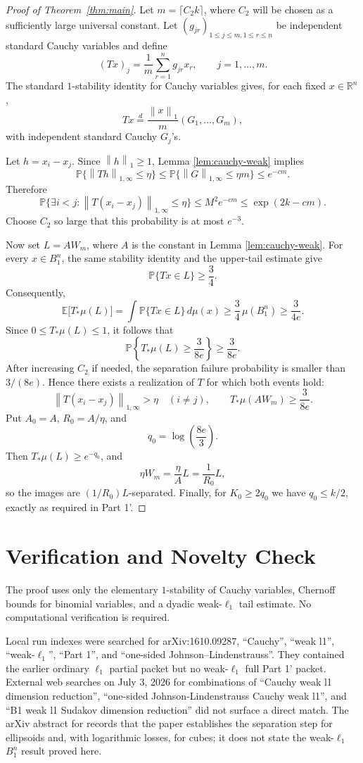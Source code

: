 \documentclass[11pt]{article}
\newcommand{\R}{\mathbb R}
\newcommand{\Pbb}{\mathbb P}
\newcommand{\E}{\mathbb E}
\newcommand{\norm}[1]{\left\lVert #1 \right\rVert}
\begin{document}
\begin{proof}[Proof of Theorem~\ref{thm:main}]
Let \(m=\lceil C_2 k\rceil\), where \(C_2\) will be chosen as a sufficiently
large universal constant.  Let \((g_{jr})_{1\le j\le m,1\le r\le n}\) be
independent standard Cauchy variables and define
\[
  (Tx)_j=\frac1m\sum_{r=1}^n g_{jr}x_r,
  \qquad j=1,\ldots,m.
\]
The standard \(1\)-stability identity for Cauchy variables gives, for each
fixed \(x\in\R^n\),
\[
  Tx \stackrel{d}{=} \frac{\norm{x}_1}{m}(G_1,\ldots,G_m),
\]
with independent standard Cauchy \(G_j\)'s.

Let \(h=x_i-x_j\).  Since \(\norm{h}_1\ge 1\), Lemma
\ref{lem:cauchy-weak} implies
\[
  \Pbb\{\norm{Th}_{1,\infty}\le \eta\}
  \le
  \Pbb\{\norm{G}_{1,\infty}\le \eta m\}
  \le e^{-cm}.
\]
Therefore
\[
  \Pbb\{\exists i<j:\norm{T(x_i-x_j)}_{1,\infty}\le \eta\}
  \le M^2 e^{-cm}\le \exp(2k-cm).
\]
Choose \(C_2\) so large that this probability is at most \(e^{-3}\).

Now set \(L=A W_m\), where \(A\) is the constant in Lemma
\ref{lem:cauchy-weak}.  For every \(x\in B_1^n\), the same stability identity
and the upper-tail estimate give
\[
  \Pbb\{Tx\in L\}\ge \frac34 .
\]
Consequently,
\[
  \E\bigl[T_*\mu(L)\bigr]
  =
  \int \Pbb\{Tx\in L\}\,d\mu(x)
  \ge
  \frac34\,\mu(B_1^n)
  \ge
  \frac{3}{4e}.
\]
Since \(0\le T_*\mu(L)\le 1\), it follows that
\[
  \Pbb\left\{T_*\mu(L)\ge \frac{3}{8e}\right\}\ge \frac{3}{8e}.
\]
After increasing \(C_2\) if needed, the separation failure probability is
smaller than \(3/(8e)\).  Hence there exists a realization of \(T\) for which
both events hold:
\[
  \norm{T(x_i-x_j)}_{1,\infty}>\eta \quad (i\ne j),
  \qquad
  T_*\mu(AW_m)\ge \frac{3}{8e}.
\]
Put \(A_0=A\), \(R_0=A/\eta\), and
\[
  q_0=\log\left(\frac{8e}{3}\right).
\]
Then \(T_*\mu(L)\ge e^{-q_0}\), and
\[
  \eta W_m=\frac{\eta}{A}L=\frac1{R_0}L,
\]
so the images are \((1/R_0)L\)-separated.  Finally, for
\(K_0\ge 2q_0\) we have \(q_0\le k/2\), exactly as required in Part 1'.
\end{proof}

\section*{Verification and Novelty Check}

The proof uses only the elementary \(1\)-stability of Cauchy variables,
Chernoff bounds for binomial variables, and a dyadic weak-\(\ell_1\) tail
estimate.  No computational verification is required.

Local run indexes were searched for arXiv:1610.09287, ``Cauchy'',
``weak l1'', ``weak-\(\ell_1\)'', ``Part 1'', and
``one-sided Johnson--Lindenstrauss''.  They contained the earlier ordinary
\(\ell_1\) partial packet but no weak-\(\ell_1\) full Part 1' packet.
External web searches on July 3, 2026 for combinations of
``Cauchy weak l1 dimension reduction'', ``one-sided Johnson-Lindenstrauss
Cauchy weak l1'', and ``B1 weak l1 Sudakov dimension reduction'' did not
surface a direct match.  The arXiv abstract for \cite{MMP} records that the
paper establishes the separation step for ellipsoids and, with logarithmic
losses, for cubes; it does not state the weak-\(\ell_1\) \(B_1^n\) result
proved here.
\end{document}
